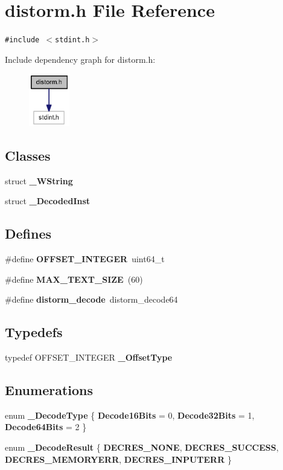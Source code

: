 \section{distorm.h File Reference}
\label{distorm_8h}
{\tt \#include $<$stdint.h$>$}\par


Include dependency graph for distorm.h:\nopagebreak
\begin{figure}[H]
\begin{center}
\leavevmode
\includegraphics[width=50pt]{distorm_8h__incl}
\end{center}
\end{figure}
\subsection*{Classes}
\begin{CompactItemize}
\item 
struct {\bf \_\-WString}
\item 
struct {\bf \_\-DecodedInst}
\end{CompactItemize}
\subsection*{Defines}
\begin{CompactItemize}
\item 
\#define {\bf OFFSET\_\-INTEGER}~uint64\_\-t
\item 
\#define {\bf MAX\_\-TEXT\_\-SIZE}~(60)
\item 
\#define {\bf distorm\_\-decode}~distorm\_\-decode64
\end{CompactItemize}
\subsection*{Typedefs}
\begin{CompactItemize}
\item 
typedef OFFSET\_\-INTEGER {\bf \_\-OffsetType}
\end{CompactItemize}
\subsection*{Enumerations}
\begin{CompactItemize}
\item 
enum {\bf \_\-DecodeType} \{ {\bf Decode16Bits} =  0, 
{\bf Decode32Bits} =  1, 
{\bf Decode64Bits} =  2
 \}
\item 
enum {\bf \_\-DecodeResult} \{ {\bf DECRES\_\-NONE}, 
{\bf DECRES\_\-SUCCESS}, 
{\bf DECRES\_\-MEMORYERR}, 
{\bf DECRES\_\-INPUTERR}
 \}
\end{CompactItemize}
